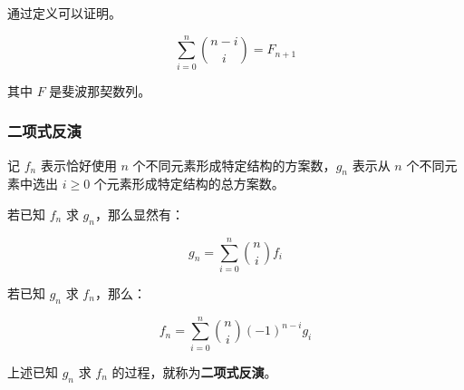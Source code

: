 通过定义可以证明。

\[
\sum_{i=0}^n\binom{n-i}{i}=F_{n+1}\tag{12}
\]

其中 \( F \) 是斐波那契数列。

\subsubsection*{二项式反演}

记 \( f_n \) 表示恰好使用 \( n \) 个不同元素形成特定结构的方案数，\( g_n \) 表示从 \( n \) 个不同元素中选出 \( i \geq 0 \) 个元素形成特定结构的总方案数。

若已知 \( f_n \) 求 \( g_n \)，那么显然有：

\[
g_n = \sum_{i = 0}^{n} \binom{n}{i} f_i
\]

若已知 \( g_n \) 求 \( f_n \)，那么：

\[
f_n = \sum_{i = 0}^{n} \binom{n}{i} (-1)^{n-i} g_i
\]

上述已知 \( g_n \) 求 \( f_n \) 的过程，就称为\textbf{二项式反演}。
